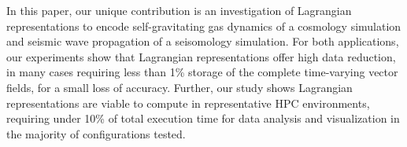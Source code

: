 %
%
%
%
%

In this paper, our unique contribution is an investigation of Lagrangian representations to encode self-gravitating gas dynamics of a cosmology simulation and seismic wave propagation of a seisomology simulation.
%
%
%
%
%
For both applications, our experiments show that Lagrangian representations offer high data reduction, in many cases requiring less than 1\% storage of the complete time-varying vector fields, for a small loss of accuracy. 
%
Further, our study shows Lagrangian representations are viable to compute in representative HPC environments, requiring under 10\% of total execution time for data analysis and visualization in the majority of configurations tested. 
